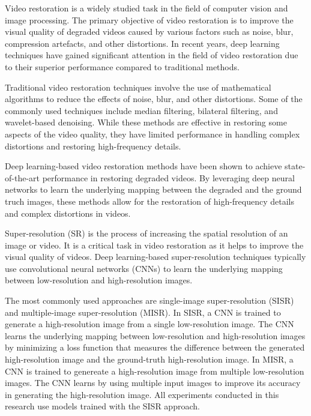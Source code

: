 \label{chap:Introduction}


Video restoration is a widely studied task in the field of computer vision and image processing. The primary objective of video restoration is to improve the visual quality of degraded videos caused by various factors such as noise, blur, compression artefacts, and other distortions. In recent years, deep learning techniques have gained significant attention in the field of video restoration due to their superior performance compared to traditional methods.

Traditional video restoration techniques involve the use of mathematical algorithms to reduce the effects of noise, blur, and other distortions. Some of the commonly used techniques include median filtering, bilateral filtering, and wavelet-based denoising. While these methods are effective in restoring some aspects of the video quality, they have limited performance in handling complex distortions and restoring high-frequency details.

Deep learning-based video restoration methods have been shown to achieve state-of-the-art performance in restoring degraded videos. By leveraging deep neural networks to learn the underlying mapping between the degraded and the ground truch images, these methods allow for the restoration of high-frequency details and complex distortions in videos.

Super-resolution (SR) is the process of increasing the spatial resolution of an image or video. It is a critical task in video restoration as it helps to improve the visual quality of videos. Deep learning-based super-resolution techniques typically use convolutional neural networks (CNNs) to learn the underlying mapping between low-resolution and high-resolution images.

The most commonly used approaches are single-image super-resolution (SISR) and multiple-image super-resolution (MISR). In SISR, a CNN is trained to generate a high-resolution image from a single low-resolution image. The CNN learns the underlying mapping between low-resolution and high-resolution images by minimizing a loss function that measures the difference between the generated high-resolution image and the ground-truth high-resolution image. In MISR, a CNN is trained to genereate a high-resolution image from multiple low-resolution images. The CNN learns by using multiple input images to improve its accuracy in generating the high-resolution image. All experiments conducted in this research use models trained with the SISR approach.

